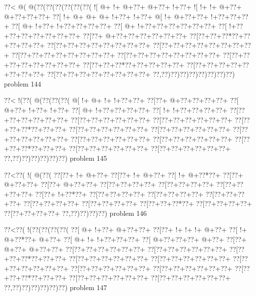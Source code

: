 \vbox{\vbox{\goo
\0??<\- @(\- @(\0??(\0??(\0??(\0??(\0??(\0??(
\- ![\- @+\- !+\- @+\0??+\- @+\0??+\- !+\0??+
\- ![\- !+\- !+\- @+\0??+\- @+\0??+\0??+\0??+
\0??[\- !+\- @+\- @+\- @+\- !+\0??+\- !+\0??+
\- @[\- !+\- @+\0??+\0??+\- !+\0??+\0??+\0??+
\0??[\- @+\- !+\0??+\- !+\0??+\0??+\0??+\0??+
\0??[\- @+\- !+\0??+\0??+\0??+\0??+\0??+\0??+
\0??[\- !+\0??+\0??+\0??+\0??+\0??+\0??+\0??+
\0??[\0??+\- @+\0??+\0??+\0??+\0??+\0??+\0??+
\0??[\0??+\0??+\0??*\0??+\0??+\0??+\0??+\0??+
\0??[\0??+\0??+\0??+\0??+\0??+\0??+\0??+\0??+
\0??[\0??+\0??+\0??+\0??+\0??+\0??+\0??+\0??+
\0??[\0??+\0??+\0??+\0??+\0??+\0??+\0??+\0??+
\0??[\0??+\0??+\0??+\0??+\0??+\0??+\0??+\0??+
\0??[\0??+\0??+\0??+\0??+\0??+\0??+\0??+\0??+
\0??[\0??+\0??+\0??*\0??+\0??+\0??+\0??+\0??+
\0??[\0??+\0??+\0??+\0??+\0??+\0??+\0??+\0??+
\0??[\0??+\0??+\0??+\0??+\0??+\0??+\0??+\0??+
\0??,\0??)\0??)\0??)\0??)\0??)\0??)\0??)\0??)
}
\hfil problem 144\hfil\break
}

\vbox{\vbox{\goo
\0??<\- !(\0??(\- @(\0??(\0??(\0??(
\- @[\- !+\- @+\- !+\- !+\0??+\0??+
\0??[\0??+\- @+\0??+\0??+\0??+\0??+
\0??[\- @+\0??+\- !+\0??+\- !+\0??+
\0??[\- @+\- !+\0??+\0??+\0??+\0??+
\0??[\- !+\- !+\0??+\0??+\0??+\0??+
\0??[\0??+\0??+\0??+\0??+\0??+\0??+
\0??[\0??+\0??+\0??+\0??+\0??+\0??+
\0??[\0??+\0??+\0??+\0??+\0??+\0??+
\0??[\0??+\0??+\0??*\0??+\0??+\0??+
\0??[\0??+\0??+\0??+\0??+\0??+\0??+
\0??[\0??+\0??+\0??+\0??+\0??+\0??+
\0??[\0??+\0??+\0??+\0??+\0??+\0??+
\0??[\0??+\0??+\0??+\0??+\0??+\0??+
\0??[\0??+\0??+\0??+\0??+\0??+\0??+
\0??[\0??+\0??+\0??*\0??+\0??+\0??+
\0??[\0??+\0??+\0??+\0??+\0??+\0??+
\0??[\0??+\0??+\0??+\0??+\0??+\0??+
\0??,\0??)\0??)\0??)\0??)\0??)\0??)
}
\hfil problem 145\hfil\break
}

\vbox{\vbox{\goo
\0??<\0??(\- !(\- @(\0??(
\0??[\0??+\- !+\- @+\0??+
\0??[\0??+\- !+\- @+\0??+
\0??[\- !+\- @+\0??*\0??+
\0??[\0??+\- @+\0??+\0??+
\0??[\0??+\- @+\0??+\0??+
\0??[\0??+\0??+\0??+\0??+
\0??[\0??+\0??+\0??+\0??+
\0??[\0??+\0??+\0??+\0??+
\0??[\0??+\- !+\0??*\0??+
\0??[\0??+\0??+\0??+\0??+
\0??[\0??+\0??+\0??+\0??+
\0??[\0??+\0??+\0??+\0??+
\0??[\0??+\0??+\0??+\0??+
\0??[\0??+\0??+\0??+\0??+
\0??[\0??+\0??+\0??*\0??+
\0??[\0??+\0??+\0??+\0??+
\0??[\0??+\0??+\0??+\0??+
\0??,\0??)\0??)\0??)\0??)
}
\hfil problem 146\hfil\break
}

\vbox{\vbox{\goo
\0??<\0??(\- !(\0??(\0??(\0??(\0??(
\0??[\- @+\- !+\0??+\- @+\0??+\0??+
\0??[\0??+\- !+\- !+\- !+\- @+\0??+
\0??[\- !+\- @+\0??*\0??+\- @+\0??+
\0??[\- @+\- !+\- !+\0??+\0??+\0??+
\0??[\- @+\0??+\0??+\0??+\- @+\0??+
\0??[\0??+\- @+\0??+\- @+\0??+\0??+
\0??[\0??+\0??+\0??+\0??+\0??+\0??+
\0??[\0??+\0??+\0??+\0??+\0??+\0??+
\0??[\0??+\0??+\0??*\0??+\0??+\0??+
\0??[\0??+\0??+\0??+\0??+\0??+\0??+
\0??[\0??+\0??+\0??+\0??+\0??+\0??+
\0??[\0??+\0??+\0??+\0??+\0??+\0??+
\0??[\0??+\0??+\0??+\0??+\0??+\0??+
\0??[\0??+\0??+\0??+\0??+\0??+\0??+
\0??[\0??+\0??+\0??*\0??+\0??+\0??+
\0??[\0??+\0??+\0??+\0??+\0??+\0??+
\0??[\0??+\0??+\0??+\0??+\0??+\0??+
\0??,\0??)\0??)\0??)\0??)\0??)\0??)
}
\hfil problem 147\hfil\break
}

